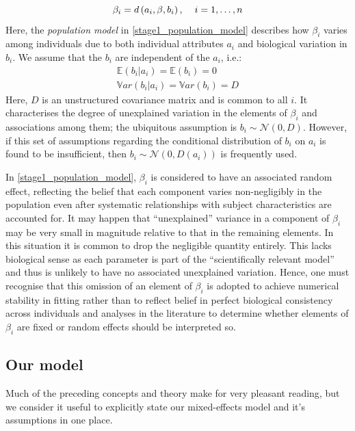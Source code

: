 \documentclass[11pt]{article} %
\begin{document}
\begin{equation} \label{stage1_population_model}
\beta_i = d\left(a_i,\beta,b_i\right), \hspace{4mm} i = 1,\ldots,n
\end{equation}
Here, the \emph{population model} in \eqref{stage1_population_model} describes how $\beta_i$ varies among individuals due to both individual attributes $a_i$ and biological variation in $b_i$. We assume that the $b_i$ are independent of the $a_i$, i.e.:
\begin{equation}
\begin{array}{l}
\mathbb{E}(b_i|a_i) = \mathbb{E}(b_i) = 0 \\
\mathbb{V}ar(b_i|a_i) = \mathbb{V}ar(b_i) = D
\end{array}
\end{equation}
Here, $D$ is an unstructured covariance matrix and is common to all $i$. It characterises the degree of unexplained variation in the elements of $\beta_i$ and associations among them; the ubiquitous assumption is $b_i \sim \mathcal{N}(0,D)$. However, if this set of assumptions regarding the conditional distribution of $b_i$ on $a_i$ is found to be insufficient, then $b_i \sim \mathcal{N}\left(0,D(a_i)\right)$ is frequently used.

In \eqref{stage1_population_model}, $\beta_i$ is considered to have an associated random effect, reflecting the belief that each component varies non-negligibly in the population even after systematic relationships with subject characteristics are accounted for. It may happen that ``unexplained'' variance in a component of $\beta_i$ may be very small in magnitude relative to that in the remaining elements. In this situation it is common to drop the negligible quantity entirely. This lacks biological sense as each parameter is part of the ``scientifically relevant model'' and thus is unlikely to have no associated unexplained variation. Hence, one must recognise that this omission of an element of $\beta_i$ is adopted to achieve numerical stability in fitting rather than to reflect belief in perfect biological consistency across individuals and analyses in the literature to determine whether elements of $\beta_i$ are fixed or random effects should be interpreted so.

\subsection{Our model} \label{subsect_model}
Much of the preceding concepts and theory make for very pleasant reading, but we consider it useful to explicitly state our mixed-effects model and it's assumptions in one place.
\end{document}
